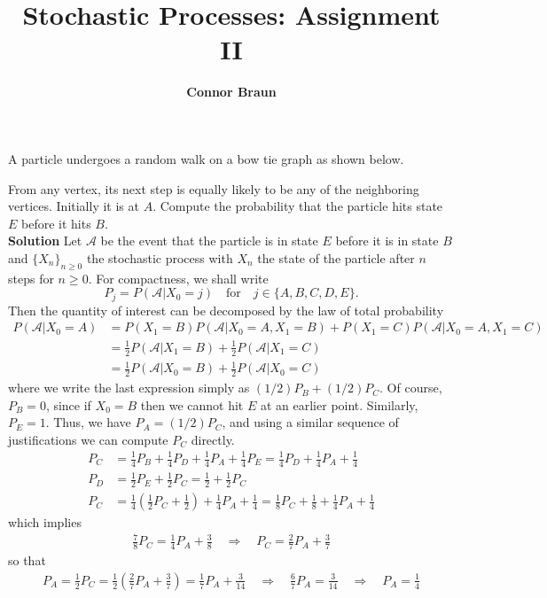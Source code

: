 \documentclass[11pt, letterpaper]{article}
\title{\bf Stochastic Processes: Assignment II}
\author{\bf Connor Braun}
\date{}
\newcommand{\mc}[1]{\mathcal{#1}}
\begin{document}
    \maketitle
     A particle undergoes a random walk on a bow tie graph as shown below.
    \begin{center}
    \end{center}
    From any vertex, its next step is equally likely to be any of the neighboring vertices. Initially it is at $A$.
    Compute the probability that the particle hits state $E$ before it hits $B$.\\[10pt]
    {\bf Solution} Let $\mc{A}$ be the event that the particle is in state $E$ before it is in state $B$ and $\{X_n\}_{n\geq 0}$ the
    stochastic process with $X_n$ the state of the particle after $n$ steps for $n\geq 0$. For compactness, we shall write
    \[P_j=P(\mc{A}|X_0=j)\quad\text{for}\quad j\in\{A, B, C, D, E\}.\]
    Then the quantity of interest can be decomposed by the law of total probability
    \begin{align*}
        P(\mc{A}|X_0=A)&=P(X_1=B)P(\mc{A}|X_0=A,X_1=B)+P(X_1=C)P(\mc{A}|X_0=A,X_1=C)\\
        &=\frac{1}{2}P(\mc{A}|X_1=B)+\frac{1}{2}P(\mc{A}|X_1=C)\tag{Markov property}\\
        &=\frac{1}{2}P(\mc{A}|X_0=B)+\frac{1}{2}P(\mc{A}|X_0=C)
    \end{align*}
    where we write the last expression simply as $(1/2)P_B+(1/2)P_C$. Of course, $P_B=0$, since if $X_0=B$ then we cannot hit $E$ at 
    an earlier point. Similarly, $P_E=1$. Thus, we have $P_A=(1/2)P_C$, and using a similar sequence of justifications we can compute $P_C$ directly.
    \begin{align*}
        P_C&=\frac{1}{4}P_B+\frac{1}{4}P_D+\frac{1}{4}P_A+\frac{1}{4}P_E=\frac{1}{4}P_D+\frac{1}{4}P_A+\frac{1}{4}\tag{1}\\
        P_D&=\frac{1}{2}P_E+\frac{1}{2}P_C=\frac{1}{2}+\frac{1}{2}P_C\tag{2}\\
        P_C&=\frac{1}{4}\left(\frac{1}{2}P_C+\frac{1}{2}\right)+\frac{1}{4}P_A+\frac{1}{4}=\frac{1}{8}P_C+\frac{1}{8}+\frac{1}{4}P_A+\frac{1}{4}\tag{substituting (2) into (1)}
    \end{align*}
    which implies
    \begin{align*}
        \frac{7}{8}P_C=\frac{1}{4}P_A+\frac{3}{8}\quad\Rightarrow\quad P_C=\frac{2}{7}P_A+\frac{3}{7}
    \end{align*}
    so that 
    \begin{align*}
        P_A=\frac{1}{2}P_C=\frac{1}{2}\left(\frac{2}{7}P_A+\frac{3}{7}\right)=\frac{1}{7}P_A+\frac{3}{14}\quad\Rightarrow\quad \frac{6}{7}P_A=\frac{3}{14}\quad\Rightarrow\quad P_A=\frac{1}{4}\tag*{\qed}
    \end{align*}
\end{document}
